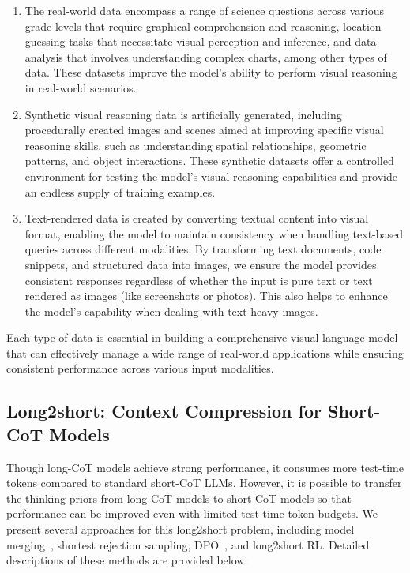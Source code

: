 \documentclass{article}
\newcommand{\citep}[1]{\parencite{#1}}
\begin{document}
\begin{enumerate}
\item The real-world data encompass a range of science questions across various grade levels that require graphical comprehension and reasoning, location guessing tasks that necessitate visual perception and inference, and data analysis that involves understanding complex charts, among other types of data. These datasets improve the model's ability to perform visual reasoning in real-world scenarios.

\item Synthetic visual reasoning data is artificially generated, including procedurally created images and scenes aimed at improving specific visual reasoning skills, such as understanding spatial relationships, geometric patterns, and object interactions. These synthetic datasets offer a controlled environment for testing the model’s visual reasoning capabilities and provide an endless supply of training examples.

\item Text-rendered data is created by converting textual content into visual format, enabling the model to maintain consistency when handling text-based queries across different modalities. By transforming text documents, code snippets, and structured data into images, we ensure the model provides consistent responses regardless of whether the input is pure text or text rendered as images (like screenshots or photos). This also helps to enhance the model's capability when dealing with text-heavy images.

\end{enumerate}

Each type of data is essential in building a comprehensive visual language model that can effectively manage a wide range of real-world applications while ensuring consistent performance across various input modalities.

\subsection{Long2short: Context Compression for Short-CoT Models}
\label{sec:long-to-short}

Though long-CoT models achieve strong performance, it consumes more test-time tokens compared to standard short-CoT LLMs. However, it is possible to transfer the thinking priors from long-CoT models to short-CoT models so that performance can be improved even with limited test-time token budgets. We present several approaches for this long2short problem, 
including model merging~\citep{yang2024model}, shortest rejection sampling, DPO~\citep{rafailov2024direct}, and long2short RL. 
Detailed descriptions of these methods are provided below:
\end{document}

